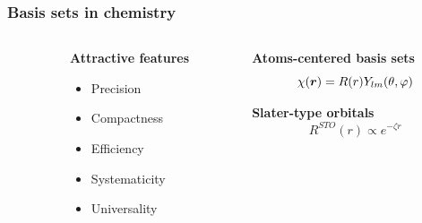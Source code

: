 \begin{frame}
    \frametitle{Basis sets in chemistry}
    \begin{columns}
    \begin{column}{.10\textwidth}
    \end{column}
    \begin{column}{.30\textwidth}
    \textbf{Attractive features}
    \begin{itemize}
        \item {\color{green} Precision}
        \item {\color{green} Compactness}
        \item {\color{red} Efficiency}
        \item {\color{yellow} Systematicity}
        \item {\color{yellow} Universality}
    \end{itemize}
    \end{column}
    \begin{column}{.60\textwidth}
    \centering
    \textbf{Atoms-centered basis sets}
    \begin{equation}
        \nonumber
        \chi(\boldsymbol r) = R(r)Y_{lm}(\theta,\varphi)
    \end{equation}

    \vspace{5mm}

    \textbf{Slater-type orbitals}
    \begin{equation}
        \nonumber
        R^{STO}(r) \propto e^{-\zeta r}
    \end{equation}
    \end{column}
    \end{columns}

    \vspace{5mm}


\end{frame}
